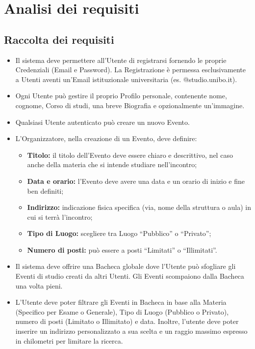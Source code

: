 \documentclass[12pt,a4paper]{report}
\begin{document}
\newpage
\tableofcontents

\newpage
\chapter{Analisi dei requisiti}

\section{Raccolta dei requisiti}
\begin{itemize}[leftmargin=*]
    \item Il sistema deve permettere all'Utente di registrarsi fornendo le proprie Credenziali (Email e Password). La Registrazione è permessa esclusivamente a Utenti aventi un'Email istituzionale universitaria (es. @studio.unibo.it).
    \item Ogni Utente può gestire il proprio Profilo personale, contenente nome, cognome, Corso di studi, una breve Biografia e opzionalmente un'immagine.
    \item Qualsiasi Utente autenticato può creare un nuovo Evento.
    \item L'Organizzatore, nella creazione di un Evento, deve definire:
    \begin{itemize}
        \item \textbf{Titolo:} il titolo dell'Evento deve essere chiaro e descrittivo, nel caso anche della materia che si intende studiare nell'incontro;
        \item \textbf{Data e orario:} l'Evento deve avere una data e un orario di inizio e fine ben definiti;
        \item \textbf{Indirizzo:} indicazione fisica specifica (via, nome della struttura o aula) in cui si terrà l'incontro;
        \item \textbf{Tipo di Luogo:} scegliere tra Luogo ``Pubblico'' o ``Privato'';
        \item \textbf{Numero di posti:} può essere a posti ``Limitati'' o ``Illimitati''.
    \end{itemize}
    \item Il sistema deve offrire una Bacheca globale dove l'Utente può sfogliare gli Eventi di studio creati da altri Utenti. Gli Eventi scompaiono dalla Bacheca una volta pieni.
    \item L'Utente deve poter filtrare gli Eventi in Bacheca in base alla Materia (Specifico per Esame o Generale), Tipo di Luogo (Pubblico o Privato), numero di posti (Limitato o Illimitato) e data. Inoltre, l'utente deve poter inserire un indirizzo personalizzato a sua scelta e un raggio massimo espresso in chilometri per limitare la ricerca.

\end{itemize}
\end{document}
